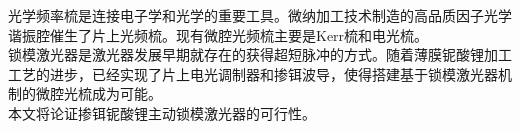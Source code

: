 \begin{cabstract}
    \kaishu
	光学频率梳是连接电子学和光学的重要工具。微纳加工技术制造的高品质因子光学谐振腔催生了片上光频梳。现有微腔光频梳主要是Kerr梳和电光梳。\\
    锁模激光器是激光器发展早期就存在的获得超短脉冲的方式。随着薄膜铌酸锂加工工艺的进步，已经实现了片上电光调制器和掺铒波导，使得搭建基于锁模激光器机制的微腔光梳成为可能。\\
    本文将论证掺铒铌酸锂主动锁模激光器的可行性。
\end{cabstract}


